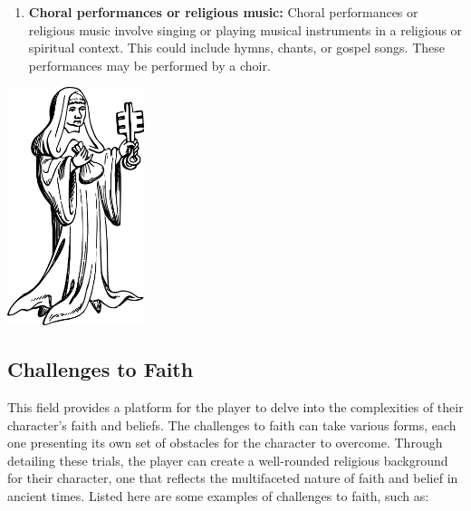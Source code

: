 \documentclass[12pt]{book}
\begin{document}
\begin{enumerate}
    \item \textbf{Choral performances or religious music:}
    Choral performances or religious music involve singing or playing musical instruments in a religious or spiritual context. This could include hymns, chants, or gospel songs. These performances may be performed by a choir.
    
\end{enumerate}

\begin{center}
    \includegraphics[width=0.3\textwidth]{./images/religion05.pdf}
\end{center}

\subsection{\textbf{Challenges to Faith}}

This field provides a platform for the player to delve into the complexities of their character's faith and beliefs. The challenges to faith can take various forms, each one presenting its own set of obstacles for the character to overcome. Through detailing these trials, the player can create a well-rounded religious background for their character, one that reflects the multifaceted nature of faith and belief in ancient times. Listed here are some examples of challenges to faith, such as:
\end{document}
